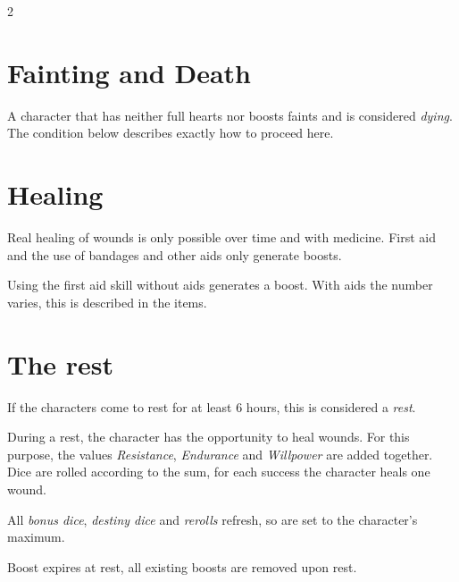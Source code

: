 \begin{multicols}{2}
\textcolor{red}{\large{}~~~~~~~~~}~\textcolor{cyan}{\large{}}

\section{Fainting and Death}

A character that has neither full hearts nor boosts faints and is considered \textit{dying}. The condition below describes exactly how to proceed here.

\section{Healing}

Real healing of wounds is only possible over time and with medicine. First aid and the use of bandages and other aids only generate boosts.

Using the first aid skill without aids generates a boost. With aids the number varies, this is described in the items.

\section{The rest}

If the characters come to rest for at least 6 hours, this is considered a \textit{rest}.

During a rest, the character has the opportunity to heal wounds. For this purpose, the values \textit{Resistance}, \textit{Endurance} and \textit{Willpower} are added together. Dice are rolled according to the sum, for each success the character heals one wound.

All \textit{bonus dice}, \textit{destiny dice} and \textit{rerolls} refresh, so are set to the character's maximum.

Boost expires at rest, all existing boosts are removed upon rest.



\end{multicols}
